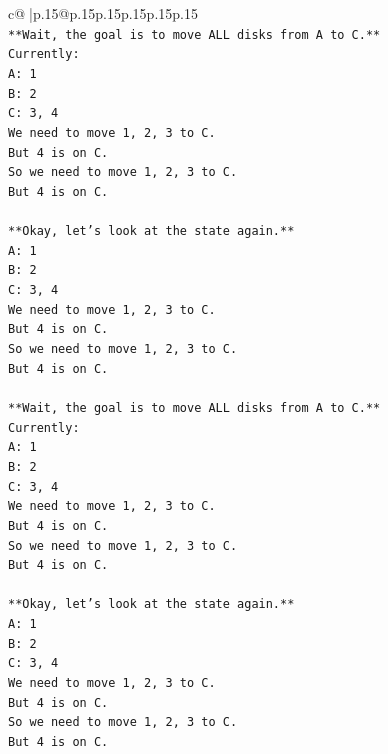 \documentclass{article}
\begin{document}
{\begin{supertabular}{c@{$\;$}|p{.15\linewidth}@{}p{.15\linewidth}p{.15\linewidth}p{.15\linewidth}p{.15\linewidth}p{.15\linewidth}}
{{{\\ 
\texttt{**Wait, the goal is to move ALL disks from A to C.**} \\
\texttt{Currently:} \\
\texttt{A: 1} \\
\texttt{B: 2} \\
\texttt{C: 3, 4} \\
\texttt{We need to move 1, 2, 3 to C.} \\
\texttt{But 4 is on C.} \\
\texttt{So we need to move 1, 2, 3 to C.} \\
\texttt{But 4 is on C.} \\
\\ 
\texttt{**Okay, let's look at the state again.**} \\
\texttt{A: 1} \\
\texttt{B: 2} \\
\texttt{C: 3, 4} \\
\texttt{We need to move 1, 2, 3 to C.} \\
\texttt{But 4 is on C.} \\
\texttt{So we need to move 1, 2, 3 to C.} \\
\texttt{But 4 is on C.} \\
\\ 
\texttt{**Wait, the goal is to move ALL disks from A to C.**} \\
\texttt{Currently:} \\
\texttt{A: 1} \\
\texttt{B: 2} \\
\texttt{C: 3, 4} \\
\texttt{We need to move 1, 2, 3 to C.} \\
\texttt{But 4 is on C.} \\
\texttt{So we need to move 1, 2, 3 to C.} \\
\texttt{But 4 is on C.} \\
\\ 
\texttt{**Okay, let's look at the state again.**} \\
\texttt{A: 1} \\
\texttt{B: 2} \\
\texttt{C: 3, 4} \\
\texttt{We need to move 1, 2, 3 to C.} \\
\texttt{But 4 is on C.} \\
\texttt{So we need to move 1, 2, 3 to C.} \\
\texttt{But 4 is on C.} \\
\\ 
}}}
\end{supertabular}}
\end{document}
